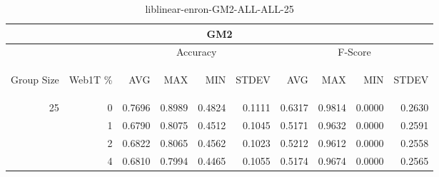 \begin{center}
\begin{table}[htbp]
\begin{tabular}{ | r | r | r | r | r | r | r | r | r | r |}
\hline
\multicolumn{10}{|c|}{GM2}\\
\hline
 & & \multicolumn{4}{|c|}{Accuracy} & \multicolumn{4}{|c|}{F-Score}\\ \cline{3-10}
\begin{sideways}Group Size\end{sideways} & \begin{sideways}Web1T \%\end{sideways} & \begin{sideways}AVG\end{sideways} & \begin{sideways}MAX\end{sideways} & \begin{sideways}MIN\end{sideways} & \begin{sideways}STDEV\end{sideways} & \begin{sideways}AVG\end{sideways} & \begin{sideways}MAX\end{sideways} & \begin{sideways}MIN\end{sideways} & \begin{sideways}STDEV\end{sideways}\\
\hline
\multirow{3}{*}{25}
 & 0 & 0.7696 & 0.8989 & 0.4824 & 0.1111 & 0.6317 & 0.9814 & 0.0000 & 0.2630\\ \cline{2-10}
 & 1 & 0.6790 & 0.8075 & 0.4512 & 0.1045 & 0.5171 & 0.9632 & 0.0000 & 0.2591\\ \cline{2-10}
 & 2 & 0.6822 & 0.8065 & 0.4562 & 0.1023 & 0.5212 & 0.9612 & 0.0000 & 0.2558\\ \cline{2-10}
 & 4 & 0.6810 & 0.7994 & 0.4465 & 0.1055 & 0.5174 & 0.9674 & 0.0000 & 0.2565\\ \cline{2-10}
\hline
\end{tabular}
\caption{liblinear-enron-GM2-ALL-ALL-25}
\label{table:liblinear-enron-GM2-ALL-ALL-25}
\end{table}
\end{center}

